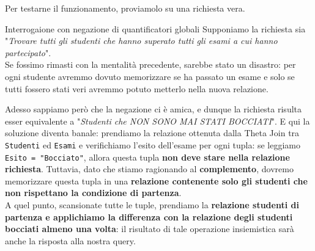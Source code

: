 \documentclass[12pt]{report}
\begin{document}
	Per testarne il funzionamento, proviamolo su una richiesta vera.
	\begin{esempio}{Interrogaione con negazione di quantificatori globali}{}
		Supponiamo la richiesta sia "\textit{Trovare tutti gli studenti che hanno superato tutti gli esami a cui hanno partecipato}".\\
		Se fossimo rimasti con la mentalità precedente, sarebbe stato un disastro: per ogni studente avremmo dovuto memorizzare se ha passato un esame e solo se tutti fossero stati veri avremmo potuto metterlo nella nuova relazione.
		\smallbreak
		
		Adesso sappiamo però che la negazione ci è amica, e dunque la richiesta risulta esser equivalente a "\textit{Studenti che NON SONO MAI STATI BOCCIATI}". E qui la soluzione diventa banale: prendiamo la relazione ottenuta dalla Theta Join tra \texttt{Studenti} ed \texttt{Esami} e verifichiamo l'esito dell'esame per ogni tupla: se leggiamo \texttt{Esito = "Bocciato"}, allora questa tupla \textbf{non deve stare nella relazione richiesta}. Tuttavia, dato che stiamo ragionando al \textbf{complemento}, dovremo memorizzare questa tupla in una \textbf{relazione contenente solo gli studenti che non rispettano la condizione di partenza}.\\
		A quel punto, scansionate tutte le tuple, prendiamo la \textbf{relazione studenti di partenza e applichiamo la differenza con la relazione degli studenti bocciati almeno una volta}: il risultato di tale operazione insiemistica sarà anche la risposta alla nostra query.
	\end{esempio}
	
\end{document}
